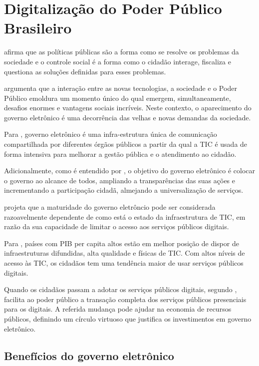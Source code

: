 \chapter{Digitalização do Poder Público Brasileiro}

\cite{tavares2022governo} afirma que as políticas públicas são a forma como se resolve os problemas da sociedade e o controle social é a forma como o cidadão interage, fiscaliza e questiona as soluções definidas para esses problemas. 

\cite{rover2009introduccao} argumenta que a interação entre as novas tecnologias, a sociedade e o Poder Público emoldura um momento único do qual emergem, simultaneamente, desafios enormes e vantagens sociais incríveis. Neste contexto, o aparecimento do governo eletrônico é uma decorrência das velhas e novas demandas da sociedade.

Para \cite{rover2009introduccao}, governo eletrônico é uma infra-estrutura única de comunicação compartilhada por diferentes órgãos públicos a partir da qual a TIC é usada de forma intensiva para melhorar a gestão pública e o atendimento ao cidadão.

Adicionalmente, como é entendido por \cite{rover2009introduccao}, o objetivo do governo eletrônico é colocar o governo ao alcance de todos, ampliando a transparências das suas ações e incrementando a participação cidadã, almejando a universalização de serviços.

\cite{singh2007country} projeta que a maturidade do governo eletrôncio pode ser considerada razoavelmente dependente de como está o estado da infraestrutura de TIC, em razão da sua capacidade de limitar o acesso aos serviços públicos digitais. 

Para \cite{singh2007country}, países com PIB per capita altos estão em melhor posição de dispor de infraestruturas difundidas, alta qualidade e físicas de TIC. Com altos níveis de acesso às TIC, os cidadãos tem uma tendência maior de usar serviços públicos digitais.

Quando os cidadãos passam a adotar os serviços públicos digitais, segundo \cite{singh2007country}, facilita ao poder público a transação completa dos serviços públicos presenciais para os digitais. A referida mudança pode ajudar na economia de recursos públicos, definindo um círculo virtuoso que justifica os investimentos em governo eletrônico.

\section{Benefícios do governo eletrônico}

